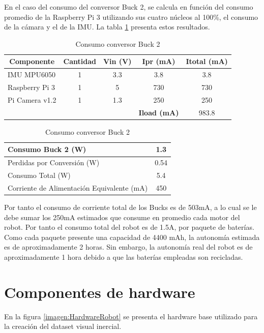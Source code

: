 En el caso del consumo del conversor Buck 2, se calcula  en función del consumo promedio de la Raspberry Pi 3 utilizando sus cuatro núcleos al 100\%, el consumo de la cámara y el de la IMU. La tabla \ref{Buck2} presenta estos resultados.

\begin{table}[htbp]
	\caption{Consumo conversor Buck 2}
		\centering
	\begin{tabular}{|l|c|c|c|c|}
		\hline
		\multicolumn{1}{|c|}{\textbf{Componente}} & \textbf{Cantidad} & \textbf{ Vin (V)} & \textbf{ Ipr (mA)} & \textbf{Itotal (mA)} \\ \hline
		IMU MPU6050 & 1 & 3.3 & 3.8 & 3.8 \\ \hline
		Raspberry Pi 3  & 1 & 5 & 730 & 730 \\ \hline
		Pi Camera  v1.2 & 1 & 1.3 & 250 & 250 \\ \hline
		& \multicolumn{1}{l|}{} & \multicolumn{1}{l|}{} & \textbf{Iload (mA)} & 983.8 \\ \hline
	\end{tabular}
	\label{Buck2}
\end{table}

\begin{table}[htbp]
	\caption{Consumo conversor Buck 2}
		\centering
	\begin{tabular}{|l|c|}
		\hline
		Consumo Buck 2 (W) & 1.3 \\ \hline
		Perdidas por Conversión (W) & 0.54 \\ \hline
		Consumo Total (W) & 5.4 \\ \hline
		Corriente de Alimentación Equivalente (mA) & 450 \\ \hline
	\end{tabular}
	\label{Buck2Perdidas}
\end{table}

Por tanto el consumo de corriente total de los Bucks es de  503mA, a lo cual se le debe sumar los 250mA estimados que consume en promedio cada motor del robot. Por tanto el consumo total del robot es de 1.5A, por paquete de baterías. Como cada paquete presente una capacidad de 4400 mAh, la autonomía estimada es de aproximadamente 2 horas. Sin embargo, la autonomía real del robot es de aproximadamente 1 hora debido a que las baterías empleadas son recicladas.



\section{Componentes de hardware}
En la figura \ref{imagen:HardwareRobot} se presenta el hardware base utilizado para la creación del dataset visual inercial.

